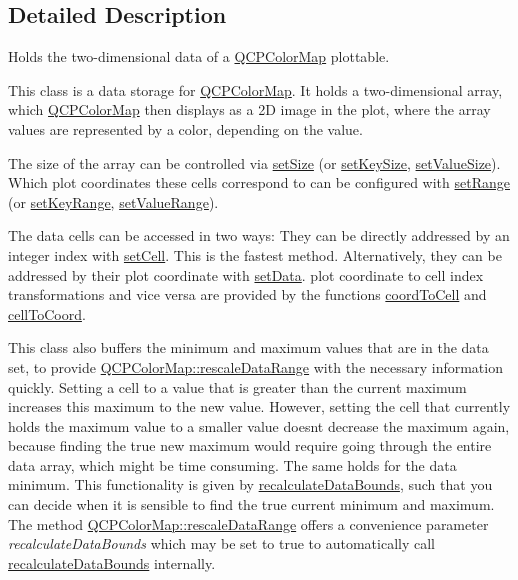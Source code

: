 \subsection{Detailed Description}
Holds the two-\/dimensional data of a \hyperlink{classQCPColorMap}{Q\+C\+P\+Color\+Map} plottable. 

This class is a data storage for \hyperlink{classQCPColorMap}{Q\+C\+P\+Color\+Map}. It holds a two-\/dimensional array, which \hyperlink{classQCPColorMap}{Q\+C\+P\+Color\+Map} then displays as a 2D image in the plot, where the array values are represented by a color, depending on the value.

The size of the array can be controlled via \hyperlink{classQCPColorMapData_a0d9ff35c299d0478b682bfbcdd9c097e}{set\+Size} (or \hyperlink{classQCPColorMapData_ac7ef70e383aface34b44dbde49234b6b}{set\+Key\+Size}, \hyperlink{classQCPColorMapData_a0893c9e3914513048b45e3429ffd16f2}{set\+Value\+Size}). Which plot coordinates these cells correspond to can be configured with \hyperlink{classQCPColorMapData_aad9c1c7c703c1339489fc730517c83d4}{set\+Range} (or \hyperlink{classQCPColorMapData_a0738c485f3c9df9ea1241b7a8bb6a86e}{set\+Key\+Range}, \hyperlink{classQCPColorMapData_ada1b2680ba96a5f4175b6d341cf75d23}{set\+Value\+Range}).

The data cells can be accessed in two ways\+: They can be directly addressed by an integer index with \hyperlink{classQCPColorMapData_a8e75eaf8746596319032a93f3d2d0683}{set\+Cell}. This is the fastest method. Alternatively, they can be addressed by their plot coordinate with \hyperlink{classQCPColorMapData_afd2083ccfd6987ec94aa7ef8e91ca39a}{set\+Data}. plot coordinate to cell index transformations and vice versa are provided by the functions \hyperlink{classQCPColorMapData_a26e33c5ec7094b60136350bcd77d3737}{coord\+To\+Cell} and \hyperlink{classQCPColorMapData_ac96d6e84befe7b9951b5da6d4d4a2a47}{cell\+To\+Coord}.

This class also buffers the minimum and maximum values that are in the data set, to provide \hyperlink{classQCPColorMap_a856608fa3dd1cc290bcd5f29a5575774}{Q\+C\+P\+Color\+Map\+::rescale\+Data\+Range} with the necessary information quickly. Setting a cell to a value that is greater than the current maximum increases this maximum to the new value. However, setting the cell that currently holds the maximum value to a smaller value doesn\textquotesingle{}t decrease the maximum again, because finding the true new maximum would require going through the entire data array, which might be time consuming. The same holds for the data minimum. This functionality is given by \hyperlink{classQCPColorMapData_ab235ade8a4d64bd3adb26a99b3dd57ee}{recalculate\+Data\+Bounds}, such that you can decide when it is sensible to find the true current minimum and maximum. The method \hyperlink{classQCPColorMap_a856608fa3dd1cc290bcd5f29a5575774}{Q\+C\+P\+Color\+Map\+::rescale\+Data\+Range} offers a convenience parameter {\itshape recalculate\+Data\+Bounds} which may be set to true to automatically call \hyperlink{classQCPColorMapData_ab235ade8a4d64bd3adb26a99b3dd57ee}{recalculate\+Data\+Bounds} internally. 

